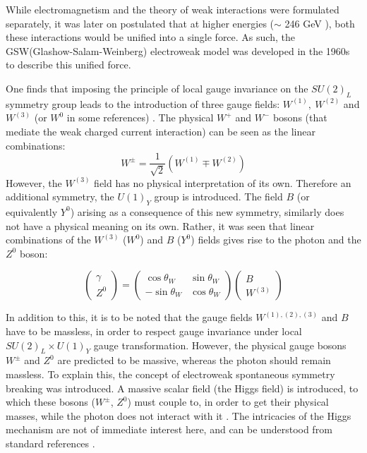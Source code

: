 While electromagnetism and the theory of weak interactions were formulated separately, it was later on postulated that at higher energies ($\sim$ 246 GeV \cite{enwiki:1085396801}), both these interactions would be unified into a single force. As such, the GSW(Glashow-Salam-Weinberg) electroweak model was developed in the 1960s to describe this unified force. 

One finds that imposing the principle of local gauge invariance on the $SU(2)_{L}$ symmetry group leads to the introduction of three gauge fields: $W^{(1)},\ W^{(2)}$ and $W^{(3)}$ (or $W^{0}$ in some references) \cite{thomson_2013}. The physical $W^{+}$ and $W^{-}$ bosons (that mediate the weak charged current interaction) can be seen as the linear combinations: 
\begin{equation}
W^{\pm}=\dfrac{1}{\sqrt{2}}\left(W^{(1)}\mp W^{(2)}\right)
\end{equation}
However, the $W^{(3)}$ field has no physical interpretation of its own. Therefore an additional symmetry, the $U(1)_{Y}$ group is introduced. The field $B$ (or equivalently $Y^{0}$) arising as a consequence of this new symmetry, similarly does not have a physical meaning on its own. Rather, it was seen that linear combinations of the $W^{(3)}$ ($W^{0}$) and $B$ ($Y^{0}$) fields gives rise to the  photon and the $Z^{0}$ boson:

\begin{equation}
\begin{pmatrix} 
\gamma \\ 
Z^{0} 
\end{pmatrix}
= 
\begin{pmatrix}
\cos \theta_{W} & \sin \theta_{W} \\
-\sin \theta_{W} & \cos \theta_{W} 
\end{pmatrix}
\begin{pmatrix}
B \\
W^{(3)}
\end{pmatrix}
\end{equation}

In addition to this, it is to be noted that the gauge fields $W^{(1),(2),(3)}$ and $B$ have to be massless, in order to respect gauge invariance under local $SU(2)_{L}\times U(1)_{Y}$ gauge transformation. However, the physical gauge bosons $W^{\pm}$ and $Z^{0}$ are predicted to be massive, whereas the photon should remain massless. To explain this, the concept of electroweak spontaneous symmetry breaking was introduced. A massive scalar field (the Higgs field) is introduced, to which these bosons ($W^{\pm}$, $Z^{0}$) must couple to, in order to get their physical masses, while the photon does not interact with it \cite{Dooling:207610}. The intricacies of the Higgs mechanism are not of immediate interest here, and can be understood from standard references \cite{thomson_2013, Griffiths:111880}.
